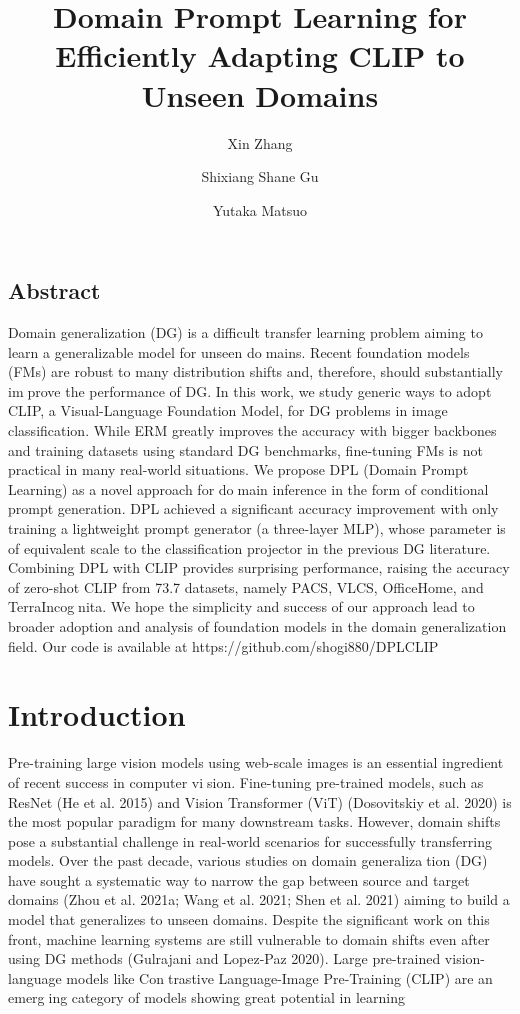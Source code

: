 \documentclass{article}
\title{Domain Prompt Learning for Efficiently Adapting CLIP to Unseen Domains}
\author[1]{Xin Zhang}
\author[1,2]{Shixiang Shane Gu}
\author[1]{Yutaka Matsuo}
\affil[1]{The University of Tokyo}
\affil[2]{Google Research, Brain Team}
\begin{document}
\maketitle
\subsection*{Abstract}
Domain generalization (DG) is a difficult transfer learning
problem aiming to learn a generalizable model for unseen domains. Recent foundation models (FMs) are robust to many
distribution shifts and, therefore, should substantially improve the performance of DG. In this work, we study generic
ways to adopt CLIP, a Visual-Language Foundation Model,
for DG problems in image classification. While ERM greatly
improves the accuracy with bigger backbones and training
datasets using standard DG benchmarks, fine-tuning FMs
is not practical in many real-world situations. We propose
DPL (Domain Prompt Learning) as a novel approach for domain inference in the form of conditional prompt generation.
DPL achieved a significant accuracy improvement with only
training a lightweight prompt generator (a three-layer MLP),
whose parameter is of equivalent scale to the classification
projector in the previous DG literature. Combining DPL with
CLIP provides surprising performance, raising the accuracy
of zero-shot CLIP from 73.7%
datasets, namely PACS, VLCS, OfficeHome, and TerraIncognita. We hope the simplicity and success of our approach
lead to broader adoption and analysis of foundation models
in the domain generalization field. Our code is available at
https://github.com/shogi880/DPLCLIP


\section{Introduction}
Pre-training large vision models using web-scale images is
an essential ingredient of recent success in computer vision. Fine-tuning pre-trained models, such as ResNet (He
et al. 2015) and Vision Transformer (ViT) (Dosovitskiy et al.
2020) is the most popular paradigm for many downstream
tasks. However, domain shifts pose a substantial challenge
in real-world scenarios for successfully transferring models.
Over the past decade, various studies on domain generalization (DG) have sought a systematic way to narrow the gap
between source and target domains (Zhou et al. 2021a; Wang
et al. 2021; Shen et al. 2021) aiming to build a model that
generalizes to unseen domains. Despite the significant work
on this front, machine learning systems are still vulnerable
to domain shifts even after using DG methods (Gulrajani and
Lopez-Paz 2020).
Large pre-trained vision-language models like Contrastive Language-Image Pre-Training (CLIP) are an emerging category of models showing great potential in learning
\end{document}

